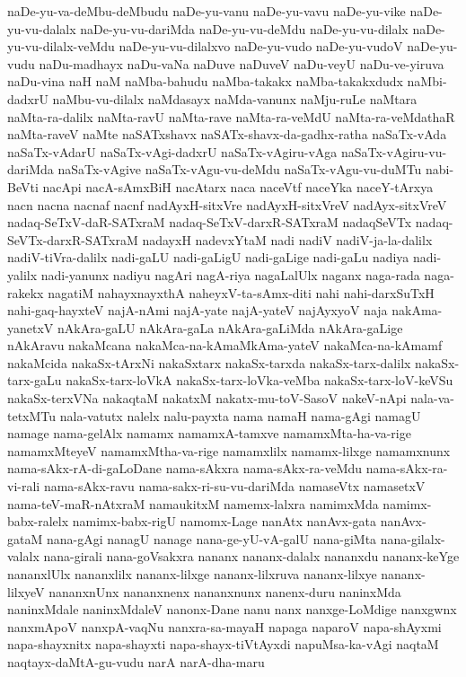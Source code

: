 {naDe-yu-va-deMbu-deMbudu
naDe-yu-vanu
naDe-yu-vavu
naDe-yu-vike
naDe-yu-vu-dalalx
naDe-yu-vu-dariMda
naDe-yu-vu-deMdu
naDe-yu-vu-dilalx
naDe-yu-vu-dilalx-veMdu
naDe-yu-vu-dilalxvo
naDe-yu-vudo
naDe-yu-vudoV
naDe-yu-vudu
naDu-madhayx
naDu-vaNa
naDuve
naDuveV
naDu-veyU
naDu-ve-yiruva
naDu-vina
naH
naM
naMba-bahudu
naMba-takakx
naMba-takakxdudx
naMbi-dadxrU
naMbu-vu-dilalx
naMdasayx
naMda-vanunx
naMju-ruLe
naMtara
naMta-ra-dalilx
naMta-ravU
naMta-rave
naMta-ra-veMdU
naMta-ra-veMdathaR
naMta-raveV
naMte
naSATxshavx
naSATx-shavx-da-gadhx-ratha
naSaTx-vAda
naSaTx-vAdarU
naSaTx-vAgi-dadxrU
naSaTx-vAgiru-vAga
naSaTx-vAgiru-vu-dariMda
naSaTx-vAgive
naSaTx-vAgu-vu-deMdu
naSaTx-vAgu-vu-duMTu
nabi-BeVti
nacApi
nacA-sAmxBiH
nacAtarx
naca
naceVtf
naceYka
naceY-tArxya
nacn
nacna
nacnaf
nacnf
nadAyxH-sitxVre
nadAyxH-sitxVreV
nadAyx-sitxVreV
nadaq-SeTxV-daR-SATxraM
nadaq-SeTxV-darxR-SATxraM
nadaqSeVTx
nadaq-SeVTx-darxR-SATxraM
nadayxH
nadevxYtaM
nadi
nadiV
nadiV-ja-la-dalilx
nadiV-tiVra-dalilx
nadi-gaLU
nadi-gaLigU
nadi-gaLige
nadi-gaLu
nadiya
nadi-yalilx
nadi-yanunx
nadiyu
nagAri
nagA-riya
nagaLalUlx
naganx
naga-rada
naga-rakekx
nagatiM
nahayxnayxthA
naheyxV-ta-sAmx-diti
nahi
nahi-darxSuTxH
nahi-gaq-hayxteV
najA-nAmi
najA-yate
najA-yateV
najAyxyoV
naja
nakAma-yanetxV
nAkAra-gaLU
nAkAra-gaLa
nAkAra-gaLiMda
nAkAra-gaLige
nAkAravu
nakaMcana
nakaMca-na-kAmaMkAma-yateV
nakaMca-na-kAmamf
nakaMcida
nakaSx-tArxNi
nakaSxtarx
nakaSx-tarxda
nakaSx-tarx-dalilx
nakaSx-tarx-gaLu
nakaSx-tarx-loVkA
nakaSx-tarx-loVka-veMba
nakaSx-tarx-loV-keVSu
nakaSx-terxVNa
nakaqtaM
nakatxM
nakatx-mu-toV-SasoV
nakeV-nApi
nala-va-tetxMTu
nala-vatutx
nalelx
nalu-payxta
nama
namaH
nama-gAgi
namagU
namage
nama-gelAlx
namamx
namamxA-tamxve
namamxMta-ha-va-rige
namamxMteyeV
namamxMtha-va-rige
namamxlilx
namamx-lilxge
namamxnunx
nama-sAkx-rA-di-gaLoDane
nama-sAkxra
nama-sAkx-ra-veMdu
nama-sAkx-ra-vi-rali
nama-sAkx-ravu
nama-sakx-ri-su-vu-dariMda
namaseVtx
namasetxV
nama-teV-maR-nAtxraM
namaukitxM
namemx-lalxra
namimxMda
namimx-babx-ralelx
namimx-babx-rigU
namomx-Lage
nanAtx
nanAvx-gata
nanAvx-gataM
nana-gAgi
nanagU
nanage
nana-ge-yU-vA-galU
nana-giMta
nana-gilalx-valalx
nana-girali
nana-goVsakxra
nananx
nananx-dalalx
nananxdu
nananx-keYge
nananxlUlx
nananxlilx
nananx-lilxge
nananx-lilxruva
nananx-lilxye
nananx-lilxyeV
nananxnUnx
nananxnenx
nananxnunx
nanenx-duru
naninxMda
naninxMdale
naninxMdaleV
nanonx-Dane
nanu
nanx
nanxge-LoMdige
nanxgwnx
nanxmApoV
nanxpA-vaqNu
nanxra-sa-mayaH
napaga
naparoV
napa-shAyxmi
napa-shayxnitx
napa-shayxti
napa-shayx-tiVtAyxdi
napuMsa-ka-vAgi
naqtaM
naqtayx-daMtA-gu-vudu
narA
narA-dha-maru
}
